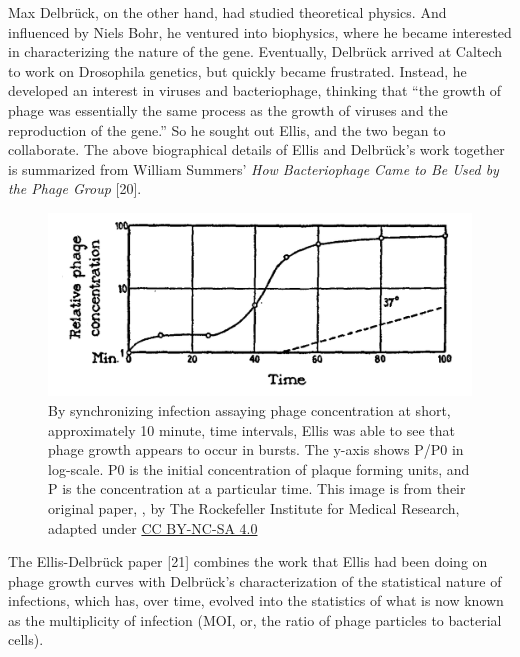 \documentclass[12pt,twoside]{mitthesis-manusdown}
\begin{document}
Max Delbrück, on the other hand, had studied theoretical physics. And
influenced by Niels Bohr, he ventured into biophysics, where he became
interested in characterizing the nature of the gene. Eventually,
Delbrück arrived at Caltech to work on Drosophila genetics, but quickly
became frustrated. Instead, he developed an interest in viruses and
bacteriophage, thinking that ``the growth of phage was essentially the
same process as the growth of viruses and the reproduction of the
gene.'' So he sought out Ellis, and the two began to collaborate. The
above biographical details of Ellis and Delbrück's work together is
summarized from William Summers' \emph{How Bacteriophage Came to Be Used
by the Phage Group} {[}20{]}.
\begin{figure}[tb!]

{\centering \includegraphics[width=0.7\linewidth]{figuresintro/oneStepGrowth} 

}

\caption{\label{fig:onestepgrowth}By synchronizing infection assaying phage concentration at short, approximately 10 minute, time intervals, Ellis was able to see that phage growth appears to occur in bursts. The y-axis shows P/P0 in log-scale. P0 is the initial concentration of plaque forming units, and P is the concentration at a particular time. This image is from their original paper, , by The Rockefeller Institute for Medical Research, adapted under \href{http://creativecommons.org/licenses/by-nc-sa/4.0/}{CC BY-NC-SA 4.0}}\label{fig:onestepgrowth}
\end{figure}
The Ellis-Delbrück paper {[}21{]} combines the work that Ellis had been
doing on phage growth curves with Delbrück's characterization of the
statistical nature of infections, which has, over time, evolved into the
statistics of what is now known as the multiplicity of infection (MOI,
or, the ratio of phage particles to bacterial cells).
\end{document}
